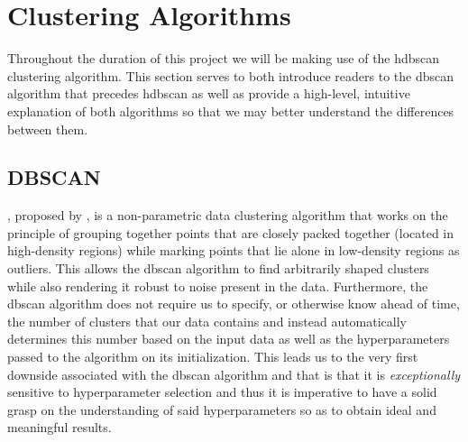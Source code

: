 \clearpage

\section{Clustering Algorithms}
\label{sec:Background-Information:Clustering-Algorithms}
Throughout the duration of this project we will be making use of the \gls{hdbscan} clustering algorithm. This section serves to both introduce readers to the \gls{dbscan} algorithm that precedes \gls{hdbscan} as well as provide a high-level, intuitive explanation of both algorithms so that we may better understand the differences between them.

\subsection{DBSCAN}
\label{subsec:Background-Information:Clustering-Algorithms:DBSCAN}
, proposed by \citet{Ester}, is a non-parametric data clustering algorithm that works on the principle of grouping together points that are closely packed together (\ie located in high-density regions) while marking points that lie alone in low-density regions as outliers. This allows the \gls{dbscan} algorithm to find arbitrarily shaped clusters while also rendering it robust to noise present in the data. Furthermore, the \gls{dbscan} algorithm does not require us to specify, or otherwise know ahead of time, the number of clusters that our data contains and instead automatically determines this number based on the input data as well as the hyperparameters passed to the algorithm on its initialization. This leads us to the very first downside associated with the \gls{dbscan} algorithm and that is that it is \textit{exceptionally} sensitive to hyperparameter selection and thus it is imperative to have a solid grasp on the understanding of said hyperparameters so as to obtain ideal and meaningful results.

